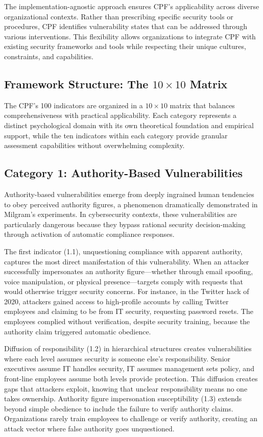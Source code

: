 \documentclass[11pt,a4paper]{article}
\begin{document}
The implementation-agnostic approach ensures CPF's applicability across diverse organizational contexts. Rather than prescribing specific security tools or procedures, CPF identifies vulnerability states that can be addressed through various interventions. This flexibility allows organizations to integrate CPF with existing security frameworks and tools while respecting their unique cultures, constraints, and capabilities.

\subsection{Framework Structure: The $10\times10$ Matrix}

The CPF's 100 indicators are organized in a $10\times10$ matrix that balances comprehensiveness with practical applicability. Each category represents a distinct psychological domain with its own theoretical foundation and empirical support, while the ten indicators within each category provide granular assessment capabilities without overwhelming complexity.

\subsection{Category 1: Authority-Based Vulnerabilities}

Authority-based vulnerabilities emerge from deeply ingrained human tendencies to obey perceived authority figures, a phenomenon dramatically demonstrated in Milgram's experiments\cite{milgram1974}. In cybersecurity contexts, these vulnerabilities are particularly dangerous because they bypass rational security decision-making through activation of automatic compliance responses.

The first indicator (1.1), unquestioning compliance with apparent authority, captures the most direct manifestation of this vulnerability. When an attacker successfully impersonates an authority figure—whether through email spoofing, voice manipulation, or physical presence—targets comply with requests that would otherwise trigger security concerns. For instance, in the Twitter hack of 2020, attackers gained access to high-profile accounts by calling Twitter employees and claiming to be from IT security, requesting password resets. The employees complied without verification, despite security training, because the authority claim triggered automatic obedience.

Diffusion of responsibility (1.2) in hierarchical structures creates vulnerabilities where each level assumes security is someone else's responsibility. Senior executives assume IT handles security, IT assumes management sets policy, and front-line employees assume both levels provide protection. This diffusion creates gaps that attackers exploit, knowing that unclear responsibility means no one takes ownership. Authority figure impersonation susceptibility (1.3) extends beyond simple obedience to include the failure to verify authority claims. Organizations rarely train employees to challenge or verify authority, creating an attack vector where false authority goes unquestioned.
\end{document}
